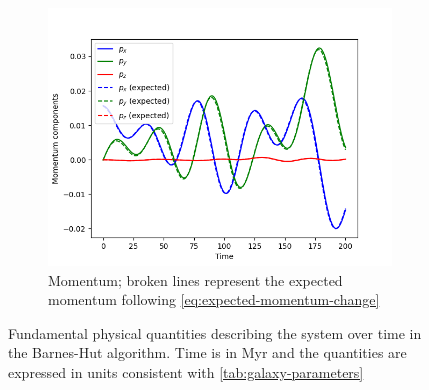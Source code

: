 \begin{figure}[H]
    \vspace{0.2cm}

    \begin{subfigure}[b]{0.5\textwidth}
        \centering
        \includegraphics[width=\textwidth]{chapters/results/img/bh-galaxy/momentum.png}
        \caption{Momentum; broken lines represent the expected momentum following \autoref{eq:expected-momentum-change}}
        \label{fig:physical-quantities-bh-sub3}
    \end{subfigure}

    \caption{Fundamental physical quantities describing the system over time in the Barnes-Hut algorithm.
        Time is in Myr and the quantities are expressed in units consistent with \autoref{tab:galaxy-parameters}}
    \label{fig:physical-quantities-bh}
\end{figure}
